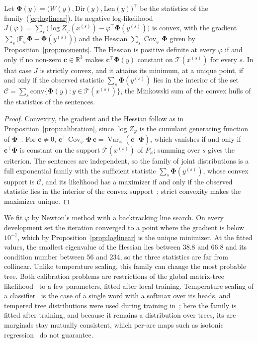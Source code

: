 \documentclass[mathematics,article,submit,pdftex,oneauthor]{Definitions/mdpi}
\newcommand{\T}{\mathcal T}
\newcommand{\R}{\mathbb R}
\newcommand{\E}{\mathbb E}
\newcommand{\Var}{\operatorname{Var}}
\newcommand{\Cov}{\operatorname{Cov}}
\begin{document}
\begin{Proposition}\label{prop:loglinear}
Let $\boldsymbol\Phi(y)=\bigl(W(y),\mathrm{Dir}(y),\mathrm{Len}(y)\bigr)^\top$ be the statistics of the family~(\ref{eq:loglinear}).
Its negative log-likelihood $J(\varphi)=\sum_s\bigl(\log Z_\varphi(x^{(s)})-\varphi^\top\boldsymbol\Phi(y^{(s)})\bigr)$ is convex, with the gradient $\sum_s\bigl(\E_\varphi\boldsymbol\Phi-\boldsymbol\Phi(y^{(s)})\bigr)$ and the Hessian $\sum_s\Cov_\varphi\boldsymbol\Phi$ given by Proposition~\ref{prop:moments}.
The Hessian is positive definite at every $\varphi$ if and only if no non-zero $\mathbf c\in\R^3$ makes $\mathbf c^\top\boldsymbol\Phi(y)$ constant on $\T(x^{(s)})$ for every $s$.
In that case $J$ is strictly convex, and it attains its minimum, at a unique point, if and only if the observed statistic $\sum_s\boldsymbol\Phi(y^{(s)})$ lies in the interior of the set $\mathcal C=\sum_s\mathrm{conv}\{\boldsymbol\Phi(y):y\in\T(x^{(s)})\}$, the Minkowski sum of the convex hulls of the statistics of the sentences.
\end{Proposition}
\begin{proof}
Convexity, the gradient and the Hessian follow as in Proposition~\ref{prop:calibration}, since $\log Z_\varphi$ is the cumulant generating function of $\boldsymbol\Phi$~\cite{WainwrightJordan2008}.
For $\mathbf c\neq0$, $\mathbf c^\top\Cov_\varphi\boldsymbol\Phi\,\mathbf c=\Var_\varphi(\mathbf c^\top\boldsymbol\Phi)$, which vanishes if and only if $\mathbf c^\top\boldsymbol\Phi$ is constant on the support $\T(x^{(s)})$ of $P_\varphi$; summing over $s$ gives the criterion.
The sentences are independent, so the family of joint distributions is a full exponential family with the sufficient statistic $\sum_s\boldsymbol\Phi(y^{(s)})$, whose convex support is $\mathcal C$, and its likelihood has a maximizer if and only if the observed statistic lies in the interior of the convex support~\cite{BarndorffNielsen1978}; strict convexity makes the maximizer unique.
\end{proof}

We fit $\varphi$ by Newton's method with a backtracking line search.
On every development set the iteration converged to a point where the gradient is below $10^{-7}$, which by Proposition~\ref{prop:loglinear} is the unique minimizer.
At the fitted values, the smallest eigenvalue of the Hessian lies between 38.8 and 66.8 and its condition number between 56 and 234, so the three statistics are far from collinear.
Unlike temperature scaling, this family can change the most probable tree.
Both calibration problems are restrictions of the global matrix-tree likelihood~\cite{Koo2007,Zhang2020TreeCRF} to a few parameters, fitted after local training.
Temperature scaling of a classifier~\cite{Guo2017} is the case of a single word with a softmax over its heads, and tempered tree distributions were used during training in~\cite{SmithEisner2006}; here the family is fitted after training, and because it remains a distribution over trees, its arc marginals stay mutually consistent, which per-arc maps such as isotonic regression~\cite{Zadrozny2002} do not guarantee.
\end{document}
